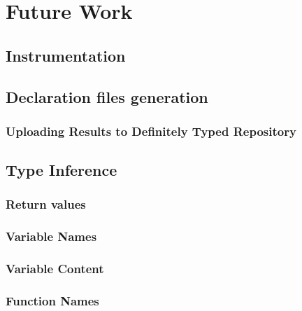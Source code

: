 \section{Future Work} \label{sec:conclusions-future-work}

\subsection{Instrumentation}

\subsection{Declaration files generation}
\subsubsection{Uploading Results to Definitely Typed Repository}


\subsection{Type Inference}


\subsubsection{Return values}

\subsubsection{Variable Names}

\subsubsection{Variable Content}

\subsubsection{Function Names}